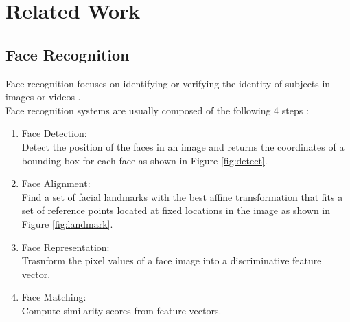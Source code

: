 \documentclass[12pt,english]{article}
\begin{document}
\section{Related Work}	

\subsection{Face Recognition}

\quad
Face recognition focuses on identifying or verifying the identity of subjects in images or videos \cite{trigueros}.\\

Face recognition systems are usually composed of the following 4 steps \cite{trigueros}: 

\begin{enumerate}
  \item Face Detection:\\ Detect the position of the faces in an image and returns the coordinates of a bounding box for each face as shown in Figure \ref{fig:detect}.
  \item Face Alignment: \\ Find a set of facial landmarks with the best affine transformation that fits a set of reference points located at fixed locations in the image as shown in Figure \ref{fig:landmark}.
  \item Face Representation: \\ Trasnform the pixel values of a face image into a discriminative feature vector.
  \item Face Matching: \\ Compute similarity scores from feature vectors.
\end{enumerate} 
 
\end{document}
